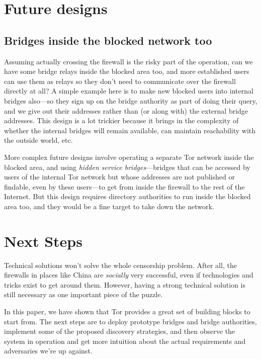 \documentclass{llncs}
\begin{document}

\section{Future designs}
\label{sec:future}

\subsection{Bridges inside the blocked network too}

Assuming actually crossing the firewall is the risky part of the
operation, can we have some bridge relays inside the blocked area too,
and more established users can use them as relays so they don't need to
communicate over the firewall directly at all? A simple example here is
to make new blocked users into internal bridges also---so they sign up
on the bridge authority as part of doing their query, and we give out
their addresses
rather than (or along with) the external bridge addresses. This design
is a lot trickier because it brings in the complexity of whether the
internal bridges will remain available, can maintain reachability with
the outside world, etc.

More complex future designs involve operating a separate Tor network
inside the blocked area, and using \emph{hidden service bridges}---bridges
that can be accessed by users of the internal Tor network but whose
addresses are not published or findable, even by these users---to get
from inside the firewall to the rest of the Internet. But this design
requires directory authorities to run inside the blocked area too,
and they would be a fine target to take down the network.


\section{Next Steps}
\label{sec:conclusion}

Technical solutions won't solve the whole censorship problem. After all,
the firewalls in places like China are \emph{socially} very
successful, even if technologies and tricks exist to get around them.
However, having a strong technical solution is still necessary as one
important piece of the puzzle.

In this paper, we have shown that Tor provides a great set of building
blocks to start from. The next steps are to deploy prototype bridges and
bridge authorities, implement some of the proposed discovery strategies,
and then observe the system in operation and get more intuition about
the actual requirements and adversaries we're up against.

 


\end{document}
